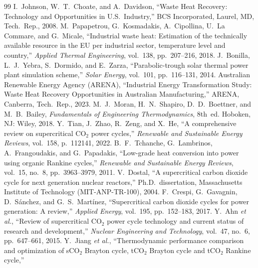 \renewcommand{\bibname}{References}
\begin{thebibliography}{99}
I.~Johnson, W.~T.~Choate, and A.~Davidson,
``Waste Heat Recovery: Technology and Opportunities in U.S.\ Industry,''
BCS Incorporated, Laurel, MD, Tech.\ Rep., 2008.
M.~Papapetrou, G.~Kosmadakis, A.~Cipollina, U.~La Commare, and G.~Micale,
``Industrial waste heat: Estimation of the technically available resource in
the EU per industrial sector, temperature level and country,''
\textit{Applied Thermal Engineering}, vol.~138, pp.~207--216, 2018.
J.~Bonilla, L.~J.~Yebra, S.~Dormido, and E.~Zarza,
``Parabolic-trough solar thermal power plant simulation scheme,''
\textit{Solar Energy}, vol.~101, pp.~116--131, 2014.
Australian Renewable Energy Agency (ARENA),
``Industrial Energy Transformation Study: Waste Heat Recovery Opportunities
in Australian Manufacturing,''
ARENA, Canberra, Tech.\ Rep., 2023.
M.~J.~Moran, H.~N.~Shapiro, D.~D.~Boettner, and M.~B.~Bailey,
\textit{Fundamentals of Engineering Thermodynamics}, 8th~ed.
Hoboken, NJ: Wiley, 2018.
Y.~Tian, J.~Zhao, R.~Zeng, and X.~He,
``A comprehensive review on supercritical CO$_2$ power cycles,''
\textit{Renewable and Sustainable Energy Reviews}, vol.~158, p.~112141, 2022.
B.~F.~Tchanche, G.~Lambrinos, A.~Frangoudakis, and G.~Papadakis,
``Low-grade heat conversion into power using organic Rankine cycles,''
\textit{Renewable and Sustainable Energy Reviews},
vol.~15, no.~8, pp.~3963--3979, 2011.
V.~Dostal,
``A supercritical carbon dioxide cycle for next generation nuclear reactors,''
Ph.D.\ dissertation, Massachusetts Institute of Technology
(MIT-ANP-TR-100), 2004.
F.~Crespi, G.~Gavagnin, D.~S{\'a}nchez, and G.~S.~Mart{\'i}nez,
``Supercritical carbon dioxide cycles for power generation: A review,''
\textit{Applied Energy}, vol.~195, pp.~152--183, 2017.
Y.~Ahn \textit{et al.},
``Review of supercritical CO$_2$ power cycle technology and current status
of research and development,''
\textit{Nuclear Engineering and Technology}, vol.~47, no.~6, pp.~647--661, 2015.
Y.~Jiang \textit{et al.},
``Thermodynamic performance comparison and optimization of sCO$_2$ Brayton
cycle, tCO$_2$ Brayton cycle and tCO$_2$ Rankine cycle,''

\end{thebibliography}
